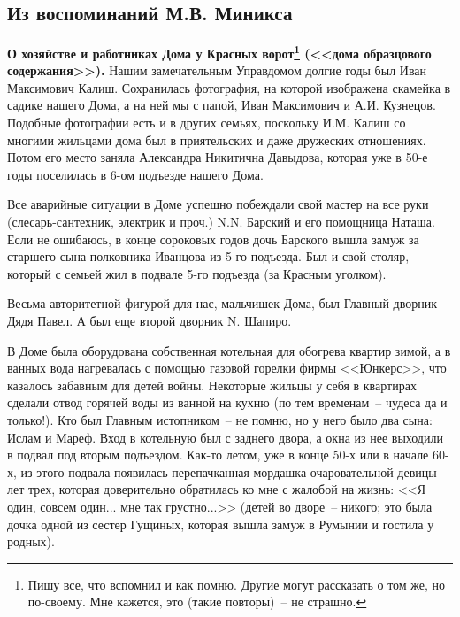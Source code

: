 \chapter{}

\section*{Из воспоминаний М.В. Миникса}

\textbf{О хозяйстве и работниках Дома у Красных ворот\protect\footnote{Пишу все, что вспомнил и как помню. Другие могут рассказать о том же, но по-своему. Мне кажется, это (такие повторы)~-- не страшно.} (<<дома образцового содержания>>).} Нашим замечательным Управдомом долгие годы был Иван Максимович Калиш. Сохранилась фотография, на которой изображена скамейка в садике нашего Дома, а на ней мы с папой, Иван Максимович и А.И. Кузнецов. Подобные фотографии есть и в других семьях, поскольку И.М. Калиш со многими жильцами дома был в приятельских и даже дружеских отношениях. Потом его место заняла Александра Никитична Давыдова, которая уже в 50-е годы поселилась в 6-ом подъезде нашего Дома.

Все аварийные ситуации в Доме успешно побеждали свой мастер на все руки (слесарь-сантехник, электрик и проч.) N.N. Барский и его помощница Наташа. Если не ошибаюсь, в конце сороковых годов дочь Барского вышла замуж за старшего сына полковника Иванцова из 5-го подъезда. Был и свой столяр, который с семьей жил в подвале 5-го подъезда (за Красным уголком).

Весьма авторитетной фигурой для нас, мальчишек Дома, был Главный дворник Дядя Павел. А был еще второй дворник N. Шапиро.

В Доме была оборудована собственная котельная для обогрева квартир зимой, а в ванных вода нагревалась с помощью газовой горелки фирмы <<Юнкерс>>, что казалось забавным для детей войны. Некоторые жильцы у себя в квартирах сделали отвод горячей воды из ванной на кухню (по тем временам~-- чудеса да и только!). Кто был Главным истопником~-- не помню, но у него было два сына: Ислам и  Мареф. Вход в котельную был с заднего двора, а окна из нее выходили в подвал под вторым подъездом. Как-то летом, уже в конце 50-х или в начале 60-х, из этого подвала появилась перепачканная мордашка очаровательной девицы лет трех, которая доверительно обратилась ко мне с жалобой на жизнь: <<Я один, совсем один... мне так грустно...>> (детей во дворе~-- никого; это была дочка одной из сестер Гущиных, которая вышла замуж в Румынии и гостила у родных).

